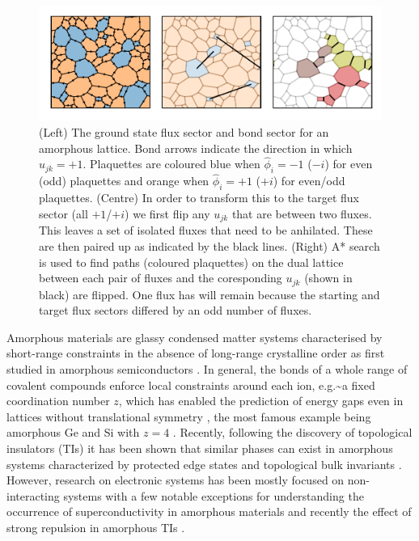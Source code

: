 \begin{figure}
\hypertarget{fig:flux_finding}{%
\centering
\includegraphics[width=1\textwidth,height=\textheight]{figure_code/amk_chapter/flux_finding/flux_finding.pdf}
\caption{(Left) The ground state flux sector and bond sector for an
amorphous lattice. Bond arrows indicate the direction in which
\(u_{jk} = +1\). Plaquettes are coloured blue when \(\hat{\phi}_i = -1\)
(\(-i\)) for even (odd) plaquettes and orange when \(\hat{\phi}_i = +1\)
(\(+i\)) for even/odd plaquettes. (Centre) In order to transform this to
the target flux sector (all \(+1\)/\(+i\)) we first flip any \(u_{jk}\)
that are between two fluxes. This leaves a set of isolated fluxes that
need to be anhilated. These are then paired up as indicated by the black
lines. (Right) A* search is used to find paths (coloured plaquettes) on
the dual lattice between each pair of fluxes and the coresponding
\(u_{jk}\) (shown in black) are flipped. One flux has will remain
because the starting and target flux sectors differed by an odd number
of fluxes.}\label{fig:flux_finding}
}
\end{figure}

Amorphous materials are glassy condensed matter systems characterised by
short-range constraints in the absence of long-range crystalline order
as first studied in amorphous semiconductors
\autocite{Yonezawa1983,zallen2008physics}. In general, the bonds of a
whole range of covalent compounds enforce local constraints around each
ion, e.g.\textasciitilde a fixed coordination number \(z\), which has
enabled the prediction of energy gaps even in lattices without
translational symmetry \autocite{Weaire1976,gaskell1979structure}, the
most famous example being amorphous Ge and Si with \(z=4\)
\autocite{Weaire1971,betteridge1973possible}. Recently, following the
discovery of topological insulators (TIs) it has been shown that similar
phases can exist in amorphous systems characterized by protected edge
states and topological bulk invariants
\autocite{mitchellAmorphousTopologicalInsulators2018,agarwala2019topological,marsalTopologicalWeaireThorpeModels2020,costa2019toward,agarwala2020higher,spring2021amorphous,corbae2019evidence}.
However, research on electronic systems has been mostly focused on
non-interacting systems with a few notable exceptions for understanding
the occurrence of superconductivity
\autocite{buckel1954einfluss,mcmillan1981electron,bergmann1976amorphous}
in amorphous materials and recently the effect of strong repulsion in
amorphous TIs \textcite{kim2022fractionalization}.

